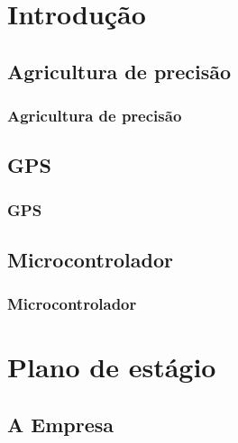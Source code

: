 \section{Introdução} %

\subsection{Agricultura de precisão}

\begin{frame}
\frametitle{Agricultura de precisão}
\end{frame}

\subsection{GPS}

\begin{frame}
\frametitle{GPS}
\end{frame}

\subsection{Microcontrolador}

\begin{frame}
\frametitle{Microcontrolador}
\end{frame}






\section{Plano de estágio}

\subsection{A Empresa}

